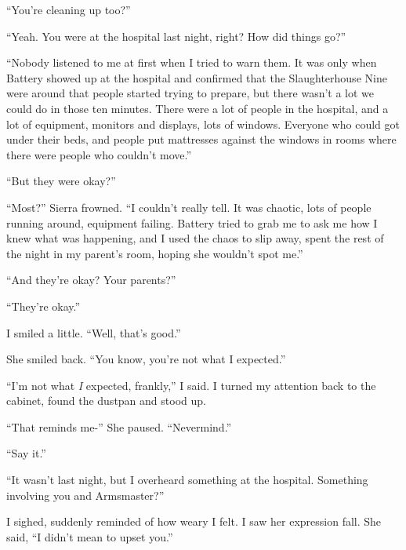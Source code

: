 ``You're cleaning up too?''



``Yeah.  You were at the hospital last night, right?  How did things go?''



``Nobody listened to me at first when I tried to warn them.  It was only when Battery showed up at the hospital and confirmed that the Slaughterhouse Nine were around that people started trying to prepare, but there wasn't a lot we could do in those ten minutes.  There were a lot of people in the hospital, and a lot of equipment, monitors and displays, lots of windows.  Everyone who could got under their beds, and people put mattresses against the windows in rooms where there were people who couldn't move.''



``But they were okay?''



``Most?'' Sierra frowned. ``I couldn't really tell.  It was chaotic, lots of people running around, equipment failing.  Battery tried to grab me to ask me how I knew what was happening, and I used the chaos to slip away, spent the rest of the night in my parent's room, hoping she wouldn't spot me.''



``And they're okay?  Your parents?''



``They're okay.''



I smiled a little.  ``Well, that's good.''



She smiled back.  ``You know, you're not what I expected.''



``I'm not what \emph{I }expected, frankly,'' I said.  I turned my attention back to the cabinet, found the dustpan and stood up.



``That reminds me-''  She paused.  ``Nevermind.''



``Say it.''



``It wasn't last night, but I overheard something at the hospital.  Something involving you and Armsmaster?''



I sighed, suddenly reminded of how weary I felt.  I saw her expression fall.  She said, ``I didn't mean to upset you.''




